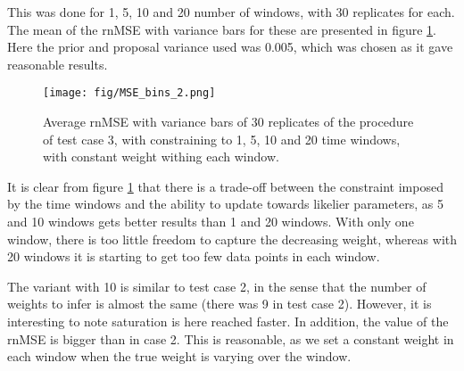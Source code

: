 This was done for 1, 5, 10 and 20 number of windows, with 30 replicates for each. The mean of the rnMSE with variance bars for these are presented in figure \ref{fig:MSE_bins}. Here the prior and proposal variance used was 0.005, which was chosen as it gave reasonable results. 

\begin{figure}[hbt!]
\caption{Average rnMSE with variance bars of 30 replicates of the procedure of test case 3, with constraining to 1, 5, 10 and 20 time windows, with constant weight withing each window.}
\label{fig:MSE_bins}
    \centering
    \texttt{[image: fig/MSE\_bins\_2.png]}
\end{figure}


It is clear from figure \ref{fig:MSE_bins} that there is a trade-off between the constraint imposed by the time windows and the ability to update towards likelier parameters, as 5 and 10 windows gets better results than 1 and 20 windows. With only one window, there is too little freedom to capture the decreasing weight, whereas with 20 windows it is starting to get too few data points in each window. 

The variant with 10 is similar to test case 2, in the sense that the number of weights to infer is almost the same (there was 9 in test case 2). However, it is interesting to note saturation is here reached faster. In addition, the value of the rnMSE is bigger than in case 2. This is reasonable, as we set a constant weight in each window when the true weight is varying over the window. 





\cleardoublepage